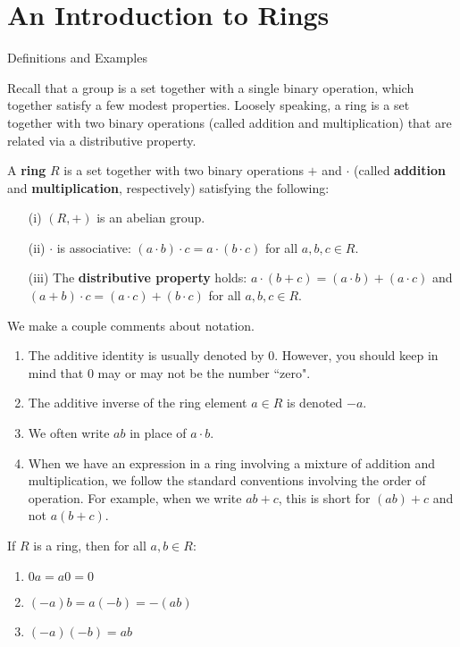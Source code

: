 \chapter{An Introduction to Rings}
\label{chapter:rings}

\begin{section}{Definitions and Examples}

Recall that a group is a set together with a single binary operation, which together satisfy a few modest properties. Loosely speaking, a ring is a set together with two binary operations (called addition and multiplication) that are related via a distributive property.

\begin{definition}
A \textbf{ring} $R$ is a set together with two binary operations $+$ and $\cdot$ (called \textbf{addition} and \textbf{multiplication}, respectively) satisfying the following:
\begin{enumerate}
\item[(i)] $(R,+)$ is an abelian group.
\item[(ii)] $\cdot$ is associative: $(a\cdot b)\cdot c=a\cdot (b\cdot c)$ for all $a,b,c\in R$.
\item[(iii)] The \textbf{distributive property} holds: $a\cdot (b+c)=(a\cdot b)+(a\cdot c)$ and $(a+b)\cdot c = (a\cdot c)+(b\cdot c)$ for all $a,b,c\in R$.
\end{enumerate}
\end{definition}

We make a couple comments about notation.
\begin{enumerate}[label=\textrm{(\alph*)}]
\item The additive identity is usually denoted by 0.  However, you should keep in mind that 0 may or may not be the number ``zero".
\item The additive inverse of the ring element $a\in R$ is denoted $-a$.
\item We often write $ab$ in place of $a\cdot b$.
\item When we have an expression in a ring involving a mixture of addition and multiplication, we follow the standard conventions involving the order of operation. For example, when we write $ab+c$, this is short for $(ab)+c$ and not $a(b+c)$.
\end{enumerate}

\begin{theorem}
If $R$ is a ring, then for all $a,b\in R$:
\begin{enumerate}[label=\textrm{(\alph*)}]
\item $0a=a0=0$
\item $(-a)b=a(-b)=-(ab)$
\item $(-a)(-b)=ab$
\end{enumerate}
\end{theorem}


\end{section}
